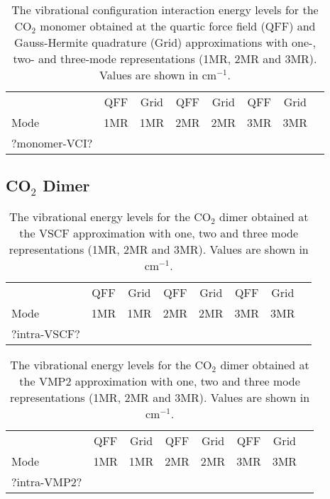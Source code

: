 \documentclass[aip,jcp,showpacs,superscriptaddress,groupedaddress]{revtex4-1}  %
\begin{document}
\begin{table}[H]
    \caption{The vibrational configuration interaction energy levels for the CO$_2$ monomer obtained at the quartic force field (QFF) and Gauss-Hermite quadrature (Grid) approximations with one-, two- and three-mode representations (1MR, 2MR and 3MR). Values are shown in cm$^{-1}$.}
\begin{ruledtabular}
\begin{tabular}{lccccccc}
    & QFF &  Grid & QFF & Grid & QFF & Grid   \\  
  Mode & 1MR & 1MR & 2MR & 2MR & 3MR & 3MR   \\ 
\hline \Tstrut
?monomer-VCI?
\end{tabular}
\end{ruledtabular}
\label{table:monomer-vci}
\end{table}

\subsection{\label{sec:dimer-freq}CO$_2$ Dimer}

\begin{table}[H]
\caption{The vibrational energy levels for the CO$_2$ dimer obtained at the VSCF approximation with one, two and three mode representations (1MR, 2MR and 3MR). Values are shown in cm$^{-1}$.}
\begin{ruledtabular}
\begin{tabular}{lccccccc}
    & QFF &  Grid & QFF & Grid & QFF & Grid   \\  
  Mode & 1MR & 1MR & 2MR & 2MR & 3MR & 3MR   \\ 
\hline \Tstrut
?intra-VSCF?
\end{tabular}
\end{ruledtabular}
\label{table:intra-vscf}
\end{table}

\begin{table}[H]
\caption{The vibrational energy levels for the CO$_2$ dimer obtained at the VMP2 approximation with one, two and three mode representations (1MR, 2MR and 3MR). Values are shown in cm$^{-1}$.}
\begin{ruledtabular}
\begin{tabular}{lccccccc}
    & QFF &  Grid & QFF & Grid & QFF & Grid   \\  
  Mode & 1MR & 1MR & 2MR & 2MR & 3MR & 3MR   \\ 
\hline \Tstrut
?intra-VMP2?
\end{tabular}
\end{ruledtabular}
\label{table:intra-vmp2}
\end{table}
\end{document}
